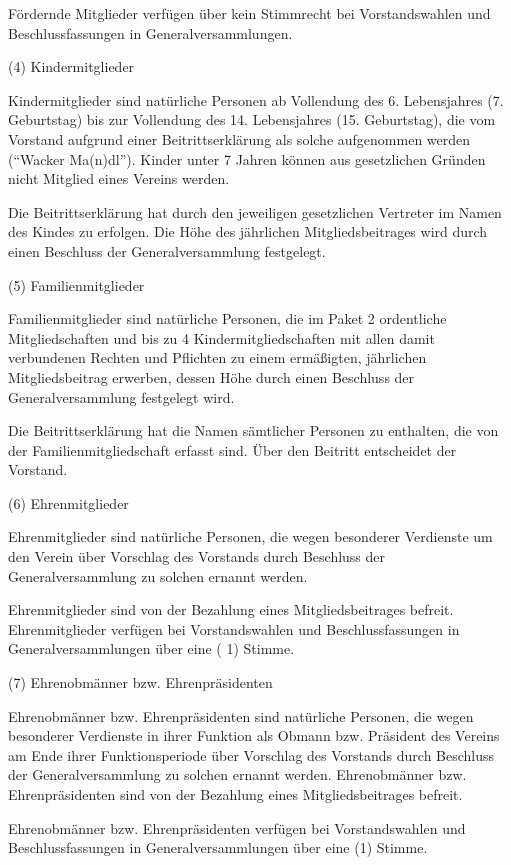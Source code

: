 \documentclass[11pt,a4paper]{article}
\begin{document}
Fördernde Mitglieder verfügen über kein Stimmrecht bei Vorstandswahlen und Beschlussfassungen in Generalversammlungen.

(4)
Kindermitglieder

Kindermitglieder sind natürliche Personen ab Vollendung des 6. Lebensjahres (7. Geburtstag) bis zur Vollendung des 14. Lebensjahres (15. Geburtstag), die vom Vorstand aufgrund einer Beitrittserklärung als solche aufgenommen werden ("`Wacker Ma(n)dl"').
Kinder unter 7 Jahren können aus gesetzlichen Gründen nicht Mitglied eines Vereins werden.

Die Beitrittserklärung hat durch den jeweiligen gesetzlichen Vertreter im Namen des Kindes zu erfolgen.
Die Höhe des jährlichen Mitgliedsbeitrages wird durch einen Beschluss der Generalversammlung festgelegt.

(5)
Familienmitglieder

Familienmitglieder sind natürliche Personen, die im Paket 2 ordentliche Mitgliedschaften und bis zu 4 Kindermitgliedschaften mit allen damit verbundenen Rechten und Pflichten zu einem ermäßigten, jährlichen Mitgliedsbeitrag erwerben, dessen Höhe durch einen Beschluss der Generalversammlung festgelegt wird.

Die Beitrittserklärung hat die Namen sämtlicher Personen zu enthalten, die von der Familienmitgliedschaft erfasst sind.
Über den Beitritt entscheidet der Vorstand.

(6)
Ehrenmitglieder

Ehrenmitglieder sind natürliche Personen, die wegen besonderer Verdienste um den Verein über Vorschlag des Vorstands durch Beschluss der Generalversammlung zu solchen ernannt werden.

Ehrenmitglieder sind von der Bezahlung eines Mitgliedsbeitrages befreit.
Ehrenmitglieder verfügen bei Vorstandswahlen und Beschlussfassungen in Generalversammlungen über eine ( 1) Stimme.

(7)
Ehrenobmänner bzw. Ehrenpräsidenten

Ehrenobmänner bzw. Ehrenpräsidenten sind natürliche Personen, die wegen besonderer Verdienste in ihrer Funktion als Obmann bzw. Präsident des Vereins am Ende ihrer Funktionsperiode über Vorschlag des Vorstands durch Beschluss der Generalversammlung zu solchen ernannt werden.
Ehrenobmänner bzw. Ehrenpräsidenten sind von der Bezahlung eines Mitgliedsbeitrages befreit.

Ehrenobmänner bzw. Ehrenpräsidenten verfügen bei Vorstandswahlen und Beschlussfassungen in Generalversammlungen über eine (1) Stimme.
\end{document}
